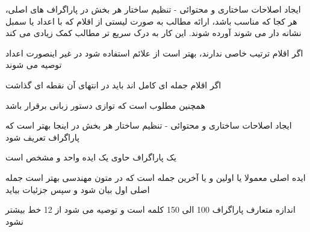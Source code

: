\documentclass[14pt]{beamer}
\newcommand{\framefontsizelarge}{\fontsize{18pt}{0pt}\selectfont}
\newcommand{\frametitlefontsize}{\fontsize{20pt}{0pt}\selectfont}
\begin{document}
\begin{persian}
	\begin{frame}[plain]{\frametitlefontsize ایجاد اصلاحات ساختاری و محتوائی - تنظیم ساختار هر بخش}
		\framefontsizelarge
		در پاراگراف های اصلی، هر کجا که مناسب باشد، ارائه مطالب به صورت لیستی از اقلام که با اعداد یا سمبل نشانه دار می شوند آورده شوند. این کار به درک سریع تر مطالب کمک زیادی می کند
		
		اگر اقلام ترتیب خاصی ندارند، بهتر است از علائم استفاده شود در غیر اینصورت اعداد توصیه می شوند
		
		اگر اقلام جمله ای کامل اند باید در انتهای آن نقطه ای گذاشت
		
		همچنین مطلوب است که توازی دستور زبانی برقرار باشد
	\end{frame}	
	
	\begin{frame}[plain]{\frametitlefontsize ایجاد اصلاحات ساختاری و محتوائی - تنظیم ساختار هر بخش}
		\framefontsizelarge
		در اینجا بهتر است که پاراگراف تعریف شود
		
		یک پاراگراف حاوی یک ایده واحد و مشخص است
		
		ایده اصلی معمولا یا اولین و یا آخرین جمله است که در متون مهندسی بهتر است جمله اصلی اول بیان شود و سپس جزئیات بیاید
		
		اندازه متعارف پاراگراف 100 الی 150 کلمه است و توصیه می شود از 12 خط بیشتر نشود
	\end{frame}	

\end{persian}
\end{document}
